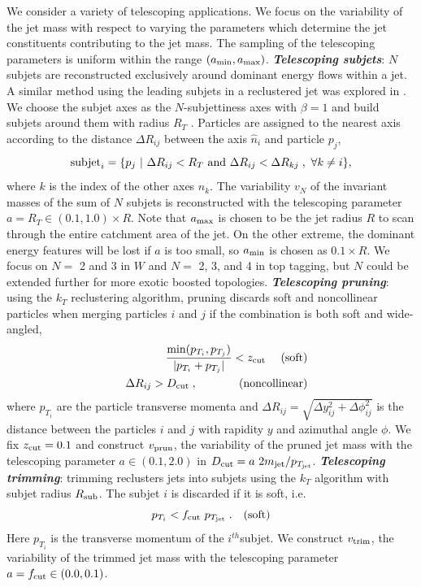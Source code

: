 \documentclass[aps,prl,floatfix,preprintnumbers,twocolumn,groupedaddress,nofootinbib]{revtex4-1}
\newcommand{\be}{\begin{equation}}
\newcommand{\ee}{\end{equation}}
\newcommand{\bea}{\begin{eqnarray}}
\newcommand{\eea}{\end{eqnarray}}
\begin{document}
We consider a variety of telescoping applications. We focus on the variability of the jet mass with respect to varying the parameters which determine the jet constituents contributing to the jet mass. The sampling of the telescoping parameters is uniform within the range $(a_{\rm min},a_{\rm max})$.
\newline \noindent \textit{\textbf{Telescoping subjets}}: $N$ subjets are reconstructed exclusively around dominant energy flows within a jet. A similar method using the leading subjets in a reclustered jet was explored in \cite{Cui:2010km}. We choose the subjet axes as the $N$-subjettiness axes \cite{Thaler:2010tr} with $\beta = 1$ and build subjets around them with radius $R_T$ \cite{Stewart:2010tn,Chien:2013kca,Stewart:2015waa,Thaler:2015xaa}. Particles are assigned to the nearest axis according to the distance $\Delta R_{ij}$ between the axis $\hat n_i$ and particle $p_j$,
\begin{equation}
    {\rm subjet}_{i} = \{p_j~|~\Delta R_{ij}<R_T~{\rm and}~\Delta R_{ij}<\Delta R_{kj}\;,~\forall k\neq i\},
\end{equation}
where $k$ is the index of the other axes $\hat n_k$. The variability $v_N$ of the invariant masses of the sum of $N$ subjets is reconstructed with the telescoping parameter $a = R_{T}\in (0.1, 1.0)\times R$. Note that $a_{\rm max}$ is chosen to be the jet radius $R$ to scan through the entire catchment area of the jet. On the other extreme, the dominant energy features will be lost if $a$ is too small, so $a_{\rm min}$ is chosen as $0.1\times R$. We focus on $N = $ 2 and 3 in $W$ and $N = $ 2, 3, and 4 in top tagging, but $N$ could be extended further for more exotic boosted topologies. %
\newline \noindent \textit{\textbf{Telescoping pruning}}: using the $k_T$ reclustering algorithm, pruning discards soft and noncollinear particles when
merging particles $i$ and $j$ if the combination is both soft and wide-angled,
\bea
    &&\frac{{\rm min}(p_{T_i},p_{T_j})}{|p_{T_i}+p_{T_j}|}<z_{\rm cut}~~~~{\rm (soft)}\nonumber\\
    &&\Delta R_{ij} > D_{\rm cut}\;,~~~~~~~~~~~{\rm (noncollinear)}
\eea
where $p_{T_i}$ are the particle transverse momenta and $\Delta R_{ij}=\sqrt{\Delta y_{ij}^2+\Delta \phi_{ij}^2}$ is the distance between the particles $i$ and $j$ with rapidity $y$ and azimuthal angle $\phi$.
We fix $z_{\rm cut}=0.1$ and construct $v_{\rm prun}$, the variability of the pruned jet mass with the telescoping parameter $a\in (0.1, 2.0)$ in $D_{\rm cut} = a~ 2m_{\rm jet}/p_{T_{\rm jet}}$.
\newline \noindent \textit{\textbf{Telescoping trimming}}: trimming reclusters jets into subjets using the $k_T$ algorithm with subjet radius $R_{\rm sub}$. The subjet $i$ is discarded if it is soft, i.e.
\be
    p_{T_i} < f_{\rm cut}~p_{T_{\rm jet}}\;.~~~{\rm (soft)}
\ee
Here $p_{T_i}$ is the transverse momentum of the $i^{th}$subjet.
We construct $v_{\rm trim}$, the variability of the trimmed jet mass with the telescoping parameter $a = f_{\rm cut} \in (0.0, 0.1)$.
\end{document}
